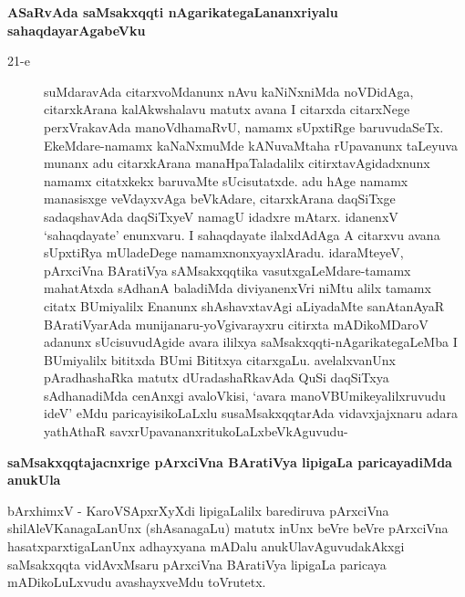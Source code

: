 {\noindent
{\large\bf ASaRvAda saMsakxqqti nAgarikategaLananxriyalu sahaqdayarAgabeVku}}\label{page51}
\begin{description}
\item[21-e] suMdaravAda citarxvoMdanunx nAvu kaNiNxniMda noVDidAga, citarxkArana kalA\-kwshalavu matutx avana I citarxda citarxNege perxVrakavAda manoVdhamaRvU, namamx sUpxtiRge baruvudaSeTx. EkeMdare-\-namamx kaNaNxmuMde kANuvaMtaha rUpavanunx taLeyuva munanx adu citarxkArana manaHpaTala\-dalilx citirxta\-vAgi\-dadxnunx namamx citatxkekx baruvaMte sUcisutatxde. adu hAge namamx manasisxge veVdayxvAga beVkAdare, citarxkArana daqSiTxge sadaqshavAda daqSiTxyeV namagU idadxre mAtarx. idanenxV `sahaqda\-yate' enunxvaru. I sahaqdayate ilalx\-dAdAga A citarxvu avana sUpxtiRya mUladeDege namamx\-nonxyayxlAradu. idaraMteyeV, pArxciVna BAratiVya sAMsakxqqtika vasutxgaLeMdare-tamamx maha\-tAtxda sAdhanA baladiMda diviyanenxVri niMtu alilx tamamx citatx BUmiyalilx Enanunx shAshavxtavAgi aLiya\-daMte sanAtanAyaR BAratiVyarAda muni\-janaru-yoVgivarayxru citirxta mADikoMDaroV adanunx sUcisuvudAgide avara ililxya saMsakxqqti-nAgarikategaLeMba I BUmiyalilx bititxda BUmi Bititxya citarxgaLu. avelalxvanUnx pAradhashaRka matutx dUradashaRkavAda QuSi daqSiTxya sAdhanadiMda cenAnxgi avaloVkisi, `avara manoVBUmikeyalilxruvudu ideV' eMdu paricayisikoLaLxlu susaMsakxqqtarAda vidavxjajxnaru adara yathAthaR savxrUpavananxritukoLaLxbeVkAguvudu-
\end{description}
{\noindent
{\large\bf saMsakxqqtajacnxrige pArxciVna BAratiVya lipigaLa paricayadiMda anukUla}}
\medskip

\noindent
bArxhimxV - KaroVSApxrXyXdi lipigaLalilx barediruva pArxciVna shilAleVKanagaLanUnx (shAsanagaLu) matutx inUnx beVre beVre pArxciVna hasatxparxtigaLanUnx adhayxyana mADalu anukUlavAguvudakAkxgi saMsakxqqta vidAvxM\-saru pArxciVna BAratiVya lipigaLa paricaya mADikoLuLxvudu avashayxveMdu toVrutetx.

